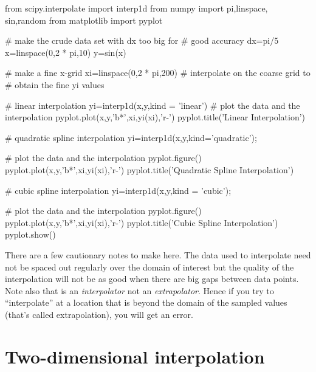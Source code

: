 \begin{codeexample}
\begin{VerbatimOut}{\listingFile}
from scipy.interpolate import interp1d
from numpy import pi,linspace, sin,random
from matplotlib import pyplot

# make the crude data set with dx too big for
# good accuracy
dx=pi/5
x=linspace(0,2 * pi,10)
y=sin(x)

# make a fine x-grid
xi=linspace(0,2 * pi,200)
# interpolate on the coarse grid to
# obtain the fine yi values

# linear interpolation
yi=interp1d(x,y,kind = 'linear')
# plot the data and the interpolation
pyplot.plot(x,y,'b*',xi,yi(xi),'r-')
pyplot.title('Linear Interpolation')

# quadratic spline interpolation
yi=interp1d(x,y,kind='quadratic');

# plot the data and the interpolation
pyplot.figure()
pyplot.plot(x,y,'b*',xi,yi(xi),'r-')
pyplot.title('Quadratic Spline Interpolation')

# cubic spline interpolation
yi=interp1d(x,y,kind = 'cubic');

# plot the data and the interpolation
pyplot.figure()
pyplot.plot(x,y,'b*',xi,yi(xi),'r-')
pyplot.title('Cubic Spline Interpolation')
pyplot.show()
\end{VerbatimOut}
\end{codeexample}
There are a few cautionary notes to make here.  The data used to
interpolate need not be spaced out regularly over the domain of
interest but the quality of the interpolation will not be as good when
there are big gaps between data points.  Note also that
 is an {\it interpolator} not an {\it extrapolator}.
Hence if you try to ``interpolate'' at a location that is beyond the
domain of the sampled values (that's called extrapolation), you will get an error.


\section{Two-dimensional interpolation}


